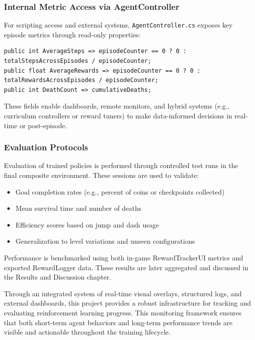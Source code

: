 \documentclass[12pt,oneside,openright,a4paper]{cpe-english-project}
\begin{document}
\subsubsection{Internal Metric Access via AgentController}

For scripting access and external systems, \texttt{AgentController.cs} exposes key episode metrics through read-only properties:

\begin{lstlisting}[language={[Sharp]C}]
public int AverageSteps => episodeCounter == 0 ? 0 : totalStepsAcrossEpisodes / episodeCounter;
public float AverageRewards => episodeCounter == 0 ? 0 : totalRewardsAcrossEpisodes / episodeCounter;
public int DeathCount => cumulativeDeaths;
\end{lstlisting}

These fields enable dashboards, remote monitors, and hybrid systems (e.g., curriculum controllers or reward tuners) to make data-informed decisions in real-time or post-episode.

\subsubsection{Evaluation Protocols}

Evaluation of trained policies is performed through controlled test runs in the final composite environment. These sessions are used to validate:

\begin{itemize}
\item Goal completion rates (e.g., percent of coins or checkpoints collected)
\item Mean survival time and number of deaths
\item Efficiency scores based on jump and dash usage
\item Generalization to level variations and unseen configurations
\end{itemize}

Performance is benchmarked using both in-game RewardTrackerUI metrics and exported RewardLogger data. These results are later aggregated and discussed in the Results and Discussion chapter.

Through an integrated system of real-time visual overlays, structured logs, and external dashboards, this project provides a robust infrastructure for tracking and evaluating reinforcement learning progress. This monitoring framework ensures that both short-term agent behaviors and long-term performance trends are visible and actionable throughout the training lifecycle.
\end{document}
